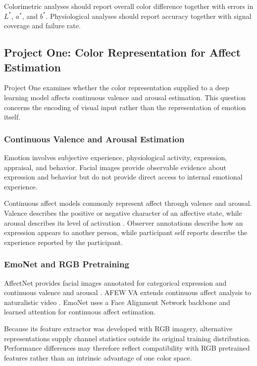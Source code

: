 \documentclass[12pt]{article}
\begin{document}
Colorimetric analyses should report overall color difference together with errors in \(L^*\), \(a^*\), and \(b^*\). Physiological analyses should report accuracy together with signal coverage and failure rate.

\subsection{Project One: Color Representation for Affect Estimation}

Project One examines whether the color representation supplied to a deep learning model affects continuous valence and arousal estimation. This question concerns the encoding of visual input rather than the representation of emotion itself.

\subsubsection{Continuous Valence and Arousal Estimation}

Emotion involves subjective experience, physiological activity, expression, appraisal, and behavior. Facial images provide observable evidence about expression and behavior but do not provide direct access to internal emotional experience.

Continuous affect models commonly represent affect through valence and arousal. Valence describes the positive or negative character of an affective state, while arousal describes its level of activation \cite{russell1980}. Observer annotations describe how an expression appears to another person, while participant self reports describe the experience reported by the participant.

\subsubsection{EmoNet and RGB Pretraining}

AffectNet provides facial images annotated for categorical expression and continuous valence and arousal \cite{mollahosseini2017}. AFEW VA extends continuous affect analysis to naturalistic video \cite{kossaifi2017}. EmoNet uses a Face Alignment Network backbone and learned attention for continuous affect estimation.

Because its feature extractor was developed with RGB imagery, alternative representations supply channel statistics outside its original training distribution. Performance differences may therefore reflect compatibility with RGB pretrained features rather than an intrinsic advantage of one color space.
\end{document}
